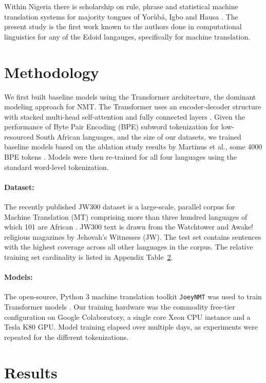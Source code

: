 \documentclass{article} %
\begin{document}
Within Nigeria there is scholarship on rule, phrase and statistical machine translation systems for majority tongues of Yor{\`u}b{\'a}, Igbo and Hausa \citep{odojelanguage}. The present study is the first work known to the authors done in computational linguistics for any of the Edoid langauges, specifically for machine translation.


\section{Methodology}
\label{methods}

We first built baseline models using the Transformer architecture, the dominant modeling approach for NMT. The Transformer uses an encoder-decoder structure with stacked multi-head self-attention and fully connected layers \citep{NIPS2017_7181}. Given the performance of Byte Pair Encoding (BPE) subword tokenization for low-resourced South African languages, and the size of our datasets, we trained baseline models based on the ablation study results by Martinus et al., some 4000 BPE tokens \citep{focus_southafrica}. Models were then re-trained for all four languages using the standard word-level tokenization.

\paragraph{Dataset:} The recently published JW300 dataset is a large-scale, parallel corpus for Machine Translation (MT) comprising more than three hundred languages of which 101 are African \citep{agic-vulic-2019-jw300}. JW300 text is drawn from the Watchtower and Awake! religious magazines by Jehovah's Witnesses (JW). The test set contains sentences with the highest coverage across all other languages in the corpus. The relative training set cardinality is listed in Appendix Table~\ref{results}. 

\paragraph{Models:} The open-source, Python 3 machine translation toolkit \texttt{JoeyNMT} was used to train Transformer models \citep{JoeyNMT}. Our training hardware was the commodity free-tier configuration on Google Colaboratory, a single core Xeon CPU instance and a Tesla K80 GPU. Model training elapsed over multiple days, as experiments were repeated for the different tokenizations.

\section{Results}
\label{results}
\end{document}
